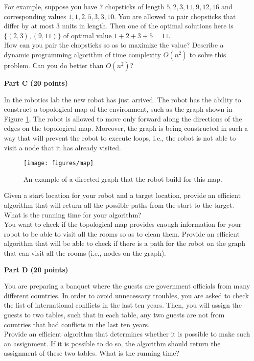 \documentclass{article}
\begin{document}
\noindent For example, suppose you have 7 chopsticks of length
$5,2,3,11,9,12,16$ and corresponding values $1,1,2,5,3,3,10$. You are
allowed to pair chopsticks that differ by at most 3 units in
length. Then one of the optimal solutions here is $\{ (2,3),(9,11) \}$
of optimal value $1+2+3+5=11$.\\

\noindent How can you pair the chopsticks so as to maximize the value?
Describe a dynamic programming algorithm of time complexity $O(n^{2})$
to solve this problem. Can you do better than $O(n^{2})$?\\

\begin{center}
{\bf Part C (20 points)}
\end{center}


 In the robotics lab the new robot has just
arrived. The robot has the ability to construct a topological map of
the environment, such as the graph shown in Figure
\ref{fig:problem3}. The robot is allowed to move only forward along
the directions of the edges on the topological map. Moreover, the
graph is being constructed in such a way that will prevent the robot
to execute loops, i.e., the robot is not able to visit a node that it
has already visited.\\

\begin{figure}[h]
\centering
\texttt{[image: figures/map]}
\caption{An example of a directed graph that the robot build for this map.}
\label{fig:problem3}
\end{figure}

 Given a start location for your robot and a target
location, provide an efficient algorithm that will return all the
possible paths from the start to the target.  What is the running time
for your algorithm?\\

 You want to check if the topological map provides
enough information for your robot to be able to visit all the rooms so
as to clean them. Provide an efficient algorithm that will be able to
check if there is a path for the robot on the graph that can visit all
the rooms (i.e., nodes on the graph).\\

\begin{center}
{\bf Part D (20 points)}
\end{center}

 You are preparing a banquet where the
guests are government officials from many different countries. In
order to avoid unnecessary troubles, you are asked to check the list
of international conflicts in the last ten years. Then, you will
assign the guests to two tables, such that in each table, any two
guests are not from countries that had conflicts in the last ten
years.\\

\noindent Provide an efficient algorithm that determines whether it is
possible to make such an assignment. If it is possible to do so, the
algorithm should return the assignment of these two tables. What is
the running time?
\end{document}
